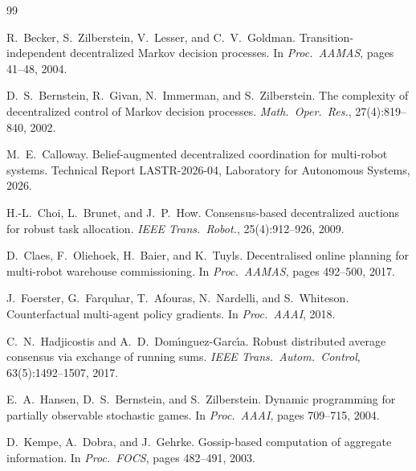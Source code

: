 \documentclass[12pt,oneside]{report}
\theoremstyle{definition}
\theoremstyle{remark}
\begin{document}
\begin{thebibliography}{99}

R.\ Becker, S.\ Zilberstein, V.\ Lesser, and C.\ V.\ Goldman.
\newblock Transition-independent decentralized Markov decision processes.
\newblock In \textit{Proc.\ AAMAS}, pages 41--48, 2004.

D.\ S.\ Bernstein, R.\ Givan, N.\ Immerman, and S.\ Zilberstein.
\newblock The complexity of decentralized control of Markov decision processes.
\newblock \textit{Math.\ Oper.\ Res.}, 27(4):819--840, 2002.

M.\ E.\ Calloway.
\newblock Belief-augmented decentralized coordination for multi-robot systems.
\newblock Technical Report LASTR-2026-04, Laboratory for Autonomous Systems, 2026.

H.-L.\ Choi, L.\ Brunet, and J.\ P.\ How.
\newblock Consensus-based decentralized auctions for robust task allocation.
\newblock \textit{IEEE Trans.\ Robot.}, 25(4):912--926, 2009.

D.\ Claes, F.\ Oliehoek, H.\ Baier, and K.\ Tuyls.
\newblock Decentralised online planning for multi-robot warehouse commissioning.
\newblock In \textit{Proc.\ AAMAS}, pages 492--500, 2017.

J.\ Foerster, G.\ Farquhar, T.\ Afouras, N.\ Nardelli, and S.\ Whiteson.
\newblock Counterfactual multi-agent policy gradients.
\newblock In \textit{Proc.\ AAAI}, 2018.

C.\ N.\ Hadjicostis and A.\ D.\ Dom{\'\i}nguez-Garc{\'\i}a.
\newblock Robust distributed average consensus via exchange of running sums.
\newblock \textit{IEEE Trans.\ Autom.\ Control}, 63(5):1492--1507, 2017.

E.\ A.\ Hansen, D.\ S.\ Bernstein, and S.\ Zilberstein.
\newblock Dynamic programming for partially observable stochastic games.
\newblock In \textit{Proc.\ AAAI}, pages 709--715, 2004.

D.\ Kempe, A.\ Dobra, and J.\ Gehrke.
\newblock Gossip-based computation of aggregate information.
\newblock In \textit{Proc.\ FOCS}, pages 482--491, 2003.


\end{thebibliography}
\end{document}
